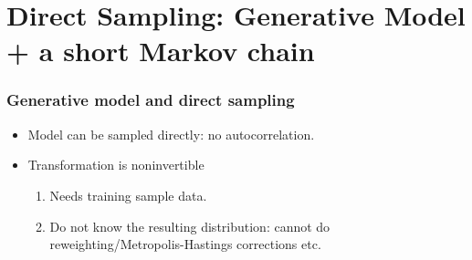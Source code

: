 \documentclass[xcolor=table, 10pt, aspectratio=169, ignorenonframetext]{beamer}
\begin{document}
\section{Direct Sampling: Generative Model + a short Markov chain}

\begin{frame}
  \frametitle{Generative model and direct sampling}
  \begin{center}
  \end{center}
  \begin{itemize}
  \item Model can be sampled directly: no autocorrelation.
  \item Transformation is noninvertible
    \begin{enumerate}
    \item Needs training sample data.
    \item Do not know the resulting distribution: cannot do reweighting/Metropolis-Hastings corrections etc.
    \end{enumerate}
  \end{itemize}
\end{frame}
\end{document}
